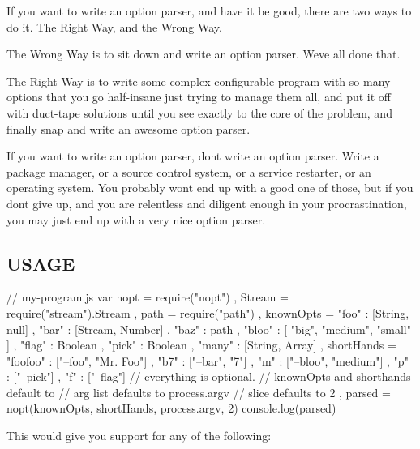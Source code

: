 If you want to write an option parser, and have it be good, there are two ways to do it. The Right Way, and the Wrong Way.

The Wrong Way is to sit down and write an option parser. We\textquotesingle{}ve all done that.

The Right Way is to write some complex configurable program with so many options that you go half-\/insane just trying to manage them all, and put it off with duct-\/tape solutions until you see exactly to the core of the problem, and finally snap and write an awesome option parser.

If you want to write an option parser, don\textquotesingle{}t write an option parser. Write a package manager, or a source control system, or a service restarter, or an operating system. You probably won\textquotesingle{}t end up with a good one of those, but if you don\textquotesingle{}t give up, and you are relentless and diligent enough in your procrastination, you may just end up with a very nice option parser.

\subsection*{U\+S\+A\+GE}

\begin{DoxyVerb}// my-program.js
var nopt = require("nopt")
  , Stream = require("stream").Stream
  , path = require("path")
  , knownOpts = { "foo" : [String, null]
                , "bar" : [Stream, Number]
                , "baz" : path
                , "bloo" : [ "big", "medium", "small" ]
                , "flag" : Boolean
                , "pick" : Boolean
                , "many" : [String, Array]
                }
  , shortHands = { "foofoo" : ["--foo", "Mr. Foo"]
                 , "b7" : ["--bar", "7"]
                 , "m" : ["--bloo", "medium"]
                 , "p" : ["--pick"]
                 , "f" : ["--flag"]
                 }
             // everything is optional.
             // knownOpts and shorthands default to {}
             // arg list defaults to process.argv
             // slice defaults to 2
  , parsed = nopt(knownOpts, shortHands, process.argv, 2)
console.log(parsed)
\end{DoxyVerb}


This would give you support for any of the following\+:



